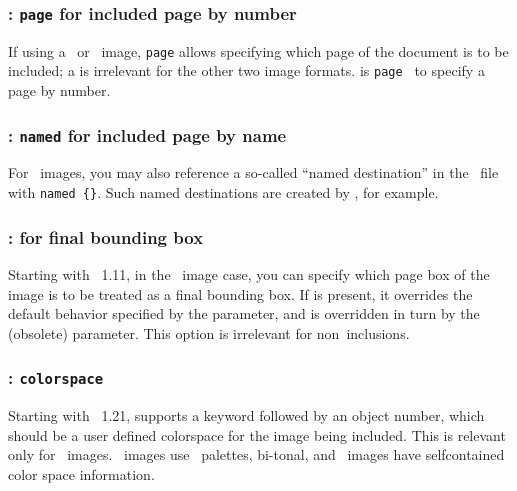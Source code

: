 \documentclass{pdftexmanual}
\begin{document}
\subsubsection{: \texttt{page} 
               for included page by number}

If using a \PDF\ or \ image, \texttt{page}  allows
specifying which page of the document is to be included; a
 is irrelevant for the other two image formats.
 is {\tt page } to specify a page
by number.

\subsubsection{: \texttt{named} 
               for included page by name}

For \PDF\ images, you may also reference a so-called ``named
destination'' in the \PDF\ file with {\tt named \{\}}. Such named destinations are created by , for
example.

\subsubsection{: 
               for final bounding box}

Starting with \PDFTEX\ 1.11, in the \PDF\ image case, you can specify
which page box of the image is to be treated as a final bounding box. If
 is present, it overrides the default behavior
specified by the  parameter, and is overridden in turn by
the (obsolete)  parameter. This option is irrelevant
for non\hyph \PDF\ inclusions.

\subsubsection{: \texttt{colorspace}
               }

Starting with \PDFTEX\ 1.21,  supports a 
keyword followed by an object number, which should be a user\hyph
defined colorspace for the image being included. This is relevant only
for \JPEG\ images. \PNG\ images use \RGB\ palettes,  bi-tonal, and
\PDF\ images have self\hyph contained color space information.
\end{document}
